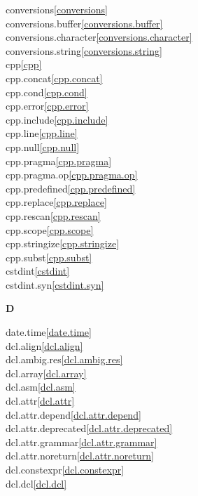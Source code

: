 \begin{multicols}{2}
conversions\quad\ref{conversions}\\
conversions.buffer\quad\ref{conversions.buffer}\\
conversions.character\quad\ref{conversions.character}\\
conversions.string\quad\ref{conversions.string}\\
cpp\quad\ref{cpp}\\
cpp.concat\quad\ref{cpp.concat}\\
cpp.cond\quad\ref{cpp.cond}\\
cpp.error\quad\ref{cpp.error}\\
cpp.include\quad\ref{cpp.include}\\
cpp.line\quad\ref{cpp.line}\\
cpp.null\quad\ref{cpp.null}\\
cpp.pragma\quad\ref{cpp.pragma}\\
cpp.pragma.op\quad\ref{cpp.pragma.op}\\
cpp.predefined\quad\ref{cpp.predefined}\\
cpp.replace\quad\ref{cpp.replace}\\
cpp.rescan\quad\ref{cpp.rescan}\\
cpp.scope\quad\ref{cpp.scope}\\
cpp.stringize\quad\ref{cpp.stringize}\\
cpp.subst\quad\ref{cpp.subst}\\
cstdint\quad\ref{cstdint}\\
cstdint.syn\quad\ref{cstdint.syn}\\
\par \textbf{D}\par
date.time\quad\ref{date.time}\\
dcl.align\quad\ref{dcl.align}\\
dcl.ambig.res\quad\ref{dcl.ambig.res}\\
dcl.array\quad\ref{dcl.array}\\
dcl.asm\quad\ref{dcl.asm}\\
dcl.attr\quad\ref{dcl.attr}\\
dcl.attr.depend\quad\ref{dcl.attr.depend}\\
dcl.attr.deprecated\quad\ref{dcl.attr.deprecated}\\
dcl.attr.grammar\quad\ref{dcl.attr.grammar}\\
dcl.attr.noreturn\quad\ref{dcl.attr.noreturn}\\
dcl.constexpr\quad\ref{dcl.constexpr}\\
dcl.dcl\quad\ref{dcl.dcl}\\

\end{multicols}
